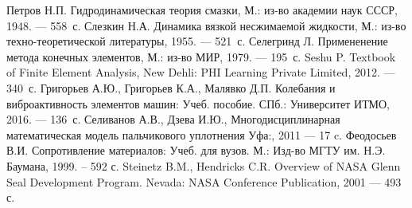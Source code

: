 \documentclass[ignoreonframetext,unicode]{beamer}
\begin{document}
\begin{frame}{}
	\begin{thebibliography}{00}
		 Петров Н.П. Гидродинамическая теория смазки, М.: из-во академии наук СССР, 1948. --- 558~с.
		 Слезкин Н.А. Динамика вязкой несжимаемой жидкости, М.: из-во техно-теоретической литературы, 1955. --- 521~с.
		 Селегринд Л. Примененение метода конечных элементов, М.: из-во МИР, 1979. --- 195~с.
		 Seshu P. Textbook of
		Finite Element
		Analysis, New Dehli: PHI Learning Private Limited, 2012. --- 340~с.
		 Григорьев А.Ю., Григорьев К.А., Малявко Д.П. Колебания
		и виброактивность элементов машин: Учеб. пособие. СПб.: Университет ИТМО, 2016. --- 136~с.
		  Селиванов А.В., Дзева И.Ю., Многодисциплинарная математическая модель пальчикового уплотнения Уфа:, 2011 --- 17 c.
		 Феодосьев В.И. Сопротивление материалов: Учеб. для вузов. М.: Изд-во МГТУ им.
		Н.Э. Баумана, 1999. – 592 с.
		 Steinetz B.M., Hendricks C.R. Overview of NASA Glenn Seal Development
		Program. Nevada: NASA
		Conference Publication, 2001 --- 493 с.
		
	\end{thebibliography}
\end{frame}
\end{document}
